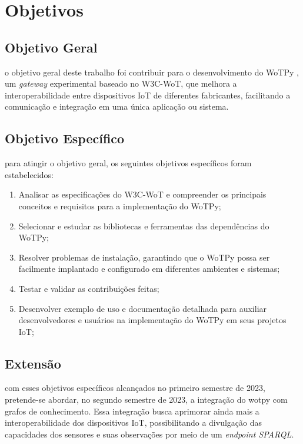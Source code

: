 \chapter{Objetivos}

\section{Objetivo Geral}

o objetivo geral deste trabalho foi contribuir para o desenvolvimento do WoTPy , um \textit{gateway} experimental baseado no W3C-WoT, que melhora a interoperabilidade entre dispositivos IoT de diferentes fabricantes, facilitando a comunicação e integração em uma única aplicação ou sistema.

\section{Objetivo Específico}

para atingir o objetivo geral, os seguintes objetivos específicos foram estabelecidos:

\begin{enumerate}
    \item Analisar as especificações do W3C-WoT  e compreender os principais conceitos e requisitos para a implementação do WoTPy;
    \item Selecionar e estudar as bibliotecas e ferramentas das dependências do WoTPy;
    \item Resolver problemas de instalação, garantindo que o WoTPy possa ser facilmente implantado e configurado em diferentes ambientes e sistemas;
    \item Testar e validar as contribuições feitas;
    \item Desenvolver exemplo de uso e documentação detalhada para auxiliar desenvolvedores e usuários na implementação do WoTPy em seus projetos IoT;
\end{enumerate}

\section{Extensão}

com esses objetivos específicos alcançados no primeiro semestre de 2023, pretende-se abordar, no segundo semestre de 2023, a integração do wotpy com grafos de conhecimento. Essa integração busca aprimorar ainda mais a interoperabilidade dos dispositivos IoT, possibilitando a divulgação das capacidades dos sensores e suas observações por meio de um \textit{endpoint SPARQL}.



